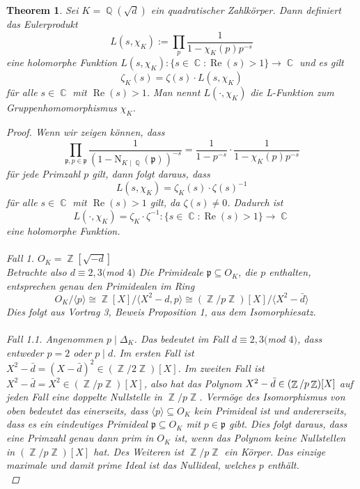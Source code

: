 \documentclass[10pt,a4paper]{article}
\theoremstyle{plain}
\newtheorem{thm}{Theorem}[section]
\theoremstyle{definition}
\theoremstyle{remark}
\DeclareMathOperator{\C}{\mathbb{C}}
\DeclareMathOperator{\Q}{\mathbb{Q}}
\DeclareMathOperator{\Z}{\mathbb{Z}}
\DeclareMathOperator{\re}{Re}
\begin{document}
\begin{thm}

Sei $K=\Q(\sqrt{d})$ ein quadratischer Zahlkörper. Dann definiert das Eulerprodukt $$L(s,\chi_K) := \prod_{p}\frac{1}{1-\chi_K(p)p^{-s}} $$ eine holomorphe Funktion $L(s,\chi_K) \colon \{s \in \C \colon \re(s) > 1\} \rightarrow \C$ und es gilt $$\zeta_K(s) = \zeta(s)\cdot L(s,\chi_K) $$ für alle $s \in \C $ mit $ \re(s) > 1$. Man nennt $L(\cdot,\chi_K)$ die L-Funktion zum Gruppenhomomorphismus $\chi_K$.

\begin{proof}

Wenn wir zeigen können, dass $$\prod_{\mathfrak{p},p \in \mathfrak{p}}\frac{1}{(1- \mathrm{N}_{K\mid \Q}(\mathfrak{p}))^{-s}}= \frac{1}{1-p^{-s}}\cdot\frac{1}{1-\chi_K(p)p^{-s}}$$ für jede Primzahl $p$ gilt, dann folgt daraus, dass $$L(s,\chi_K)= \zeta_K(s)\cdot \zeta(s)^{-1}$$ für alle $s \in \C $ mit $ \re(s)>1$ gilt, da $\zeta(s) \neq 0$. Dadurch ist $$L(\cdot,\chi_K)= \zeta_K\cdot \zeta^{-1}\colon \{s \in \C \colon \re(s)>1\}\rightarrow \C$$ eine holomorphe Funktion.
\\
\\
\textit{Fall 1.}
$O_K= \Z[\sqrt{-d}]$ \\
Betrachte also $d\equiv2,3 ($mod $ 4)$
Die Primideale $\mathfrak{p} \subseteq O_K$, die $p$ enthalten, entsprechen genau den Primidealen im Ring $$O_K /\langle p\rangle \cong \Z[X] /\langle X^2-d,p\rangle \cong (\Z/p\Z)[X]/\langle X^2-\bar{d}\rangle$$  Dies folgt aus Vortrag 3, Beweis Proposition 1, aus dem Isomorphiesatz.
\\
\\
\textit{Fall 1.1.}
Angenommen $p \mid \Delta_K$. Das bedeutet im Fall $d \equiv2,3 ($mod $ 4)$, dass entweder $p = 2$ oder $p \mid d$. Im ersten Fall ist $X^2-\bar{d} = (X-\bar{d})^2 \in (\Z/2\Z)[X]$.
Im zweiten Fall ist $X^2-\bar{d} = X^2 \in (\Z/p\Z)[X]$, also hat das Polynom $X^2-\bar{d} \\ \in (\Z/p\Z)[X]$ auf jeden Fall eine doppelte Nullstelle in $\Z/p\Z$. Vermöge des Isomorphismus von oben bedeutet das einerseits, dass $\langle p\rangle \subseteq O_K$ kein Primideal ist und andererseits, dass es ein eindeutiges Primideal $\mathfrak{p} \subseteq O_K$ mit $p \in \mathfrak{p}$ gibt. Dies folgt daraus, dass eine Primzahl genau dann prim in $O_K$  ist, wenn das Polynom keine Nullstellen in $(\Z/p\Z)[X]$ hat. Des Weiteren ist $\Z/p\Z$ ein Körper. Das einzige maximale und damit prime Ideal ist das Nullideal, welches $p$ enthält.
\\

\end{proof}
\end{thm}
\end{document}
